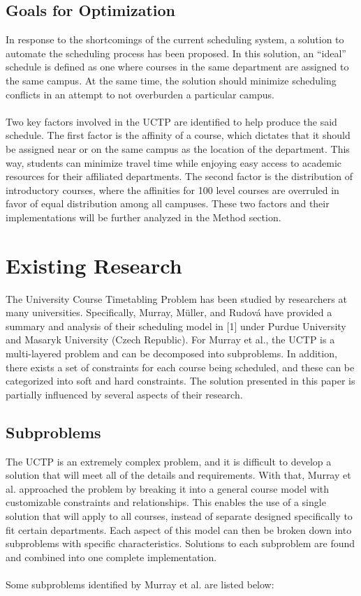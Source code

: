 \documentclass[12pt]{article}
\begin{document}
	\subsection{Goals for Optimization}
	In response to the shortcomings of the current scheduling system, a solution to
	automate the scheduling process has been proposed. In this solution, an “ideal”
	schedule is defined as one where courses in the same department are assigned to
	the same campus. At the same time, the solution should minimize scheduling
	conflicts in an attempt to not overburden a particular campus. 
	\\\\
	Two key factors involved in the UCTP are identified to help produce the said
	schedule. The first factor is the affinity of a course, which dictates that it
	should be assigned near or on the same campus as the location of the
	department. This way, students can minimize travel time while enjoying easy
	access to academic resources for their affiliated departments. The second
	factor is the distribution of introductory courses, where the affinities for
	100 level courses are overruled in favor of equal distribution among all
	campuses. These two factors and their implementations will be further analyzed
	in the Method section.

\section{Existing Research}
The University Course Timetabling Problem has been studied by researchers at
many universities. Specifically, Murray, Müller, and Rudová have provided a
summary and analysis of their scheduling model in [1] under Purdue University
and Masaryk University (Czech Republic). For Murray et al., the UCTP is a
multi-layered problem and can be decomposed into subproblems. In addition,
there exists a set of constraints for each course being scheduled, and these
can be categorized into soft and hard constraints. The solution presented in
this paper is partially influenced by several aspects of their research.

\subsection{Subproblems}
The UCTP is an extremely complex problem, and it is difficult to develop a
solution that will meet all of the details and requirements. With that, Murray
et al. approached the problem by breaking it into a general course model with
customizable constraints and relationships. This enables the use of a single
solution that will apply to all courses, instead of separate designed
specifically to fit certain departments. Each aspect of this model can then be
broken down into subproblems with specific characteristics. Solutions to each
subproblem are found and combined into one complete implementation.
\\\\
Some subproblems identified by Murray et al. are listed below:
\end{document}
